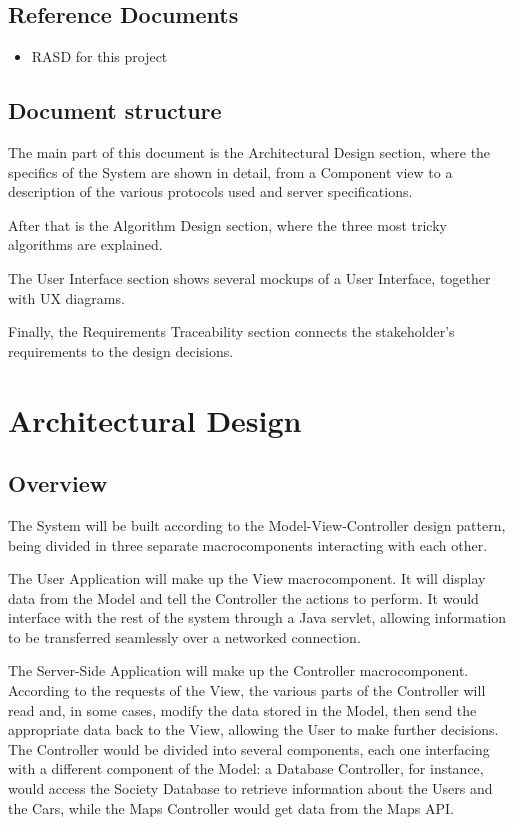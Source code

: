 \documentclass[12pt]{article}
\begin{document}
\subsection{Reference Documents}
\begin{itemize}
	\item RASD for this project
\end{itemize}
\subsection{Document structure}
The main part of this document is the Architectural Design section, where the specifics of the System are shown in detail, from a Component view to a description of the various protocols used and server specifications.

After that is the Algorithm Design section, where the three most tricky algorithms are explained.

The User Interface section shows several mockups of a User Interface, together with UX diagrams.

Finally, the Requirements Traceability section connects the stakeholder's requirements to the design decisions.

\clearpage
\section{Architectural Design}
\subsection{Overview}
\label{MVC}
The System will be built according to the Model-View-Controller design pattern, being divided in three separate macrocomponents interacting with each other.

The User Application will make up the View macrocomponent. It will display data from the Model and tell the Controller the actions to perform. It would interface with the rest of the system through a Java servlet, allowing information to be transferred seamlessly over a networked connection.

The Server-Side Application will make up the Controller macrocomponent. According to the requests of the View, the various parts of the Controller will read and, in some cases, modify the data stored in the Model, then send the appropriate data back to the View, allowing the User to make further decisions. The Controller would be divided into several components, each one interfacing with a different component of the Model: a Database Controller, for instance, would access the Society Database to retrieve information about the Users and the Cars, while the Maps Controller would get data from the Maps API.
\end{document}

